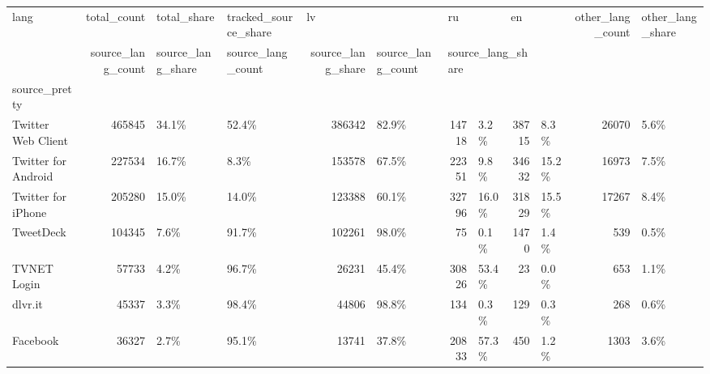 \begin{tabular}{lrllrlrlrlrl}
\toprule
lang & total\_count & total\_share & tracked\_source\_share & \multicolumn{2}{l}{lv} & \multicolumn{2}{l}{ru} & \multicolumn{2}{l}{en} & other\_lang\_count & other\_lang\_share \\
{} & source\_lang\_count & source\_lang\_share & source\_lang\_count & source\_lang\_share & source\_lang\_count & \multicolumn{3}{l}{source\_lang\_share} \\
source\_pretty       &             &             &                      &                   &                   &                   &                   &                   &                   &                  &                  \\
\midrule
Twitter Web Client  &      465845 &       34.1\% &                52.4\% &            386342 &             82.9\% &             14718 &              3.2\% &             38715 &              8.3\% &            26070 &             5.6\% \\
Twitter for Android &      227534 &       16.7\% &                 8.3\% &            153578 &             67.5\% &             22351 &              9.8\% &             34632 &             15.2\% &            16973 &             7.5\% \\
Twitter for iPhone  &      205280 &       15.0\% &                14.0\% &            123388 &             60.1\% &             32796 &             16.0\% &             31829 &             15.5\% &            17267 &             8.4\% \\
TweetDeck           &      104345 &        7.6\% &                91.7\% &            102261 &             98.0\% &                75 &              0.1\% &              1470 &              1.4\% &              539 &             0.5\% \\
TVNET Login         &       57733 &        4.2\% &                96.7\% &             26231 &             45.4\% &             30826 &             53.4\% &                23 &              0.0\% &              653 &             1.1\% \\
dlvr.it             &       45337 &        3.3\% &                98.4\% &             44806 &             98.8\% &               134 &              0.3\% &               129 &              0.3\% &              268 &             0.6\% \\
Facebook            &       36327 &        2.7\% &                95.1\% &             13741 &             37.8\% &             20833 &             57.3\% &               450 &              1.2\% &             1303 &             3.6\% \\

\end{tabular}

